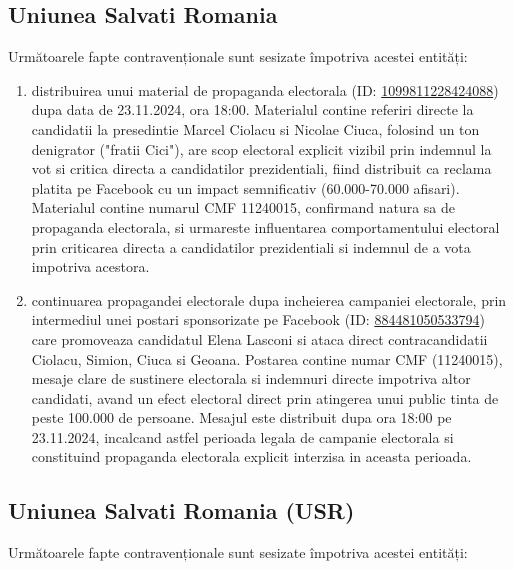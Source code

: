 \documentclass[a4paper,12pt]{article}
\begin{document}
\vspace{0.5cm}

\subsection{Uniunea Salvati Romania}
Următoarele fapte contravenționale sunt sesizate împotriva acestei entități:

\begin{enumerate}[leftmargin=*, label=\arabic*.)]
    \item distribuirea unui material de propaganda electorala (ID: \href{https://www.facebook.com/ads/library/?id=1099811228424088}{1099811228424088}) dupa data de 23.11.2024, ora 18:00. Materialul contine referiri directe la candidatii la presedintie Marcel Ciolacu si Nicolae Ciuca, folosind un ton denigrator ("fratii Cici"), are scop electoral explicit vizibil prin indemnul la vot si critica directa a candidatilor prezidentiali, fiind distribuit ca reclama platita pe Facebook cu un impact semnificativ (60.000-70.000 afisari). Materialul contine numarul CMF 11240015, confirmand natura sa de propaganda electorala, si urmareste influentarea comportamentului electoral prin criticarea directa a candidatilor prezidentiali si indemnul de a vota impotriva acestora.
    \item continuarea propagandei electorale dupa incheierea campaniei electorale, prin intermediul unei postari sponsorizate pe Facebook (ID: \href{https://www.facebook.com/ads/library/?id=884481050533794}{884481050533794}) care promoveaza candidatul Elena Lasconi si ataca direct contracandidatii Ciolacu, Simion, Ciuca si Geoana. Postarea contine numar CMF (11240015), mesaje clare de sustinere electorala si indemnuri directe impotriva altor candidati, avand un efect electoral direct prin atingerea unui public tinta de peste 100.000 de persoane. Mesajul este distribuit dupa ora 18:00 pe 23.11.2024, incalcand astfel perioada legala de campanie electorala si constituind propaganda electorala explicit interzisa in aceasta perioada.
\end{enumerate}

\vspace{0.5cm}

\subsection{Uniunea Salvati Romania (USR)}
Următoarele fapte contravenționale sunt sesizate împotriva acestei entități:
\end{document}
